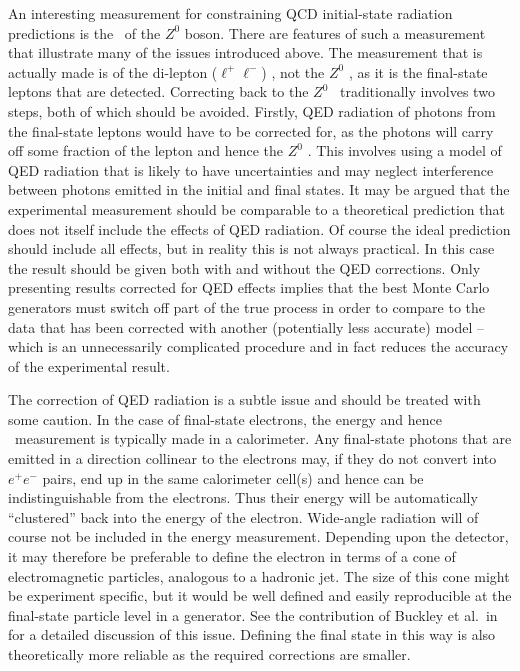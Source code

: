 An interesting measurement for constraining QCD initial-state radiation
predictions is the \pt\ of the $Z^0$ boson.  There are features of such a
measurement that illustrate many of the issues introduced above. The measurement that is actually made is of the di-lepton
($\ell^+\ell^-$) \pt, not the $Z^0$ \pt, as it is the final-state leptons
that are detected. Correcting back to the $Z^0$ \pt\ traditionally
involves two steps, both of which should be avoided. Firstly, QED
radiation of photons from the final-state leptons would have to be
corrected for, as the photons will carry off some fraction of the lepton
and hence the  $Z^0$ \pt. This involves using a model of QED radiation
that is likely to have uncertainties and may neglect interference
between photons emitted in the initial and final states. It may be
argued that the experimental measurement should be comparable to a
theoretical prediction that does not itself include the effects of QED
radiation. Of course the ideal prediction should include all effects,
but in reality this is not always practical. In this case the result
should be given both with and without the QED corrections. Only
presenting results corrected for QED effects implies that the best Monte Carlo
generators must switch off part of the true process in order to compare
to the data that has been corrected with another (potentially less
accurate)  model -- which is an unnecessarily complicated procedure and
in fact reduces the accuracy of the experimental result.


The correction of QED radiation is a subtle issue and
should be treated with some caution.  In the case of final-state
electrons, the energy and hence \pt\ measurement is typically made in a
calorimeter. Any final-state photons that are emitted in a direction
collinear to the electrons may, if they do not convert into $e^+e^-$
pairs, end up in the same calorimeter cell(s) and hence can be
indistinguishable from the electrons. Thus their energy will be
automatically ``clustered'' back into the energy of the electron. Wide-angle
radiation will of course not be included in the energy
measurement.  Depending upon
the detector, it may therefore be preferable to define the electron in
terms of a cone of electromagnetic particles, analogous to a hadronic jet. The size
of this cone might be experiment specific, but it would be well defined
and easily reproducible at the final-state particle level in a
generator.
See the contribution of Buckley et al.\ in \cite{Butterworth:2010ym}
for a detailed discussion of this issue.
Defining the final state in this way is also theoretically more reliable as
the required corrections are smaller.

